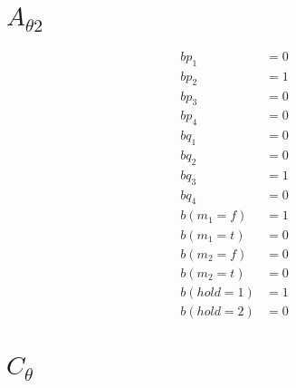 \documentclass{scrartcl}
\begin{document}
\section{$A_{\theta 2}$}
\begin{align*}
  bp_1 &= 0 \\
  bp_2 &= 1 \\
  bp_3 &= 0 \\
  bp_4 &= 0 \\
  bq_1 &= 0 \\
  bq_2 &= 0 \\
  bq_3 &= 1 \\
  bq_4 &= 0 \\
  b(m_1=f) &= 1 \\
  b(m_1=t) &= 0 \\
  b(m_2=f) &= 0 \\
  b(m_2=t) &= 0 \\
  b(hold=1) &= 1 \\
  b(hold=2) &= 0
\end{align*}

\section{$C_\theta$}
\end{document}

